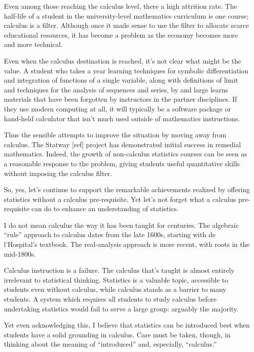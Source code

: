 Even among those reaching the calculus level,  there a high attrition rate. The half-life of a student in the university-level mathematics curriculum is one course; calculus is a filter.  Although once it made sense to use the filter to allocate scarce educational resources, it has become a problem as the economy becomes more and more technical.

Even when the calculus destination is reached, it's not clear what might be the value.  A student who takes a year learning techniques for symbolic differentiation and integration of functions of a single variable, along with definitions of limit and techniques for the analysis of sequences and series, by and large learns materials that have been forgotten by instructors in the partner disciplines.  If they use modern computing at all, it will typically be a software package or hand-held calculator that isn't much used outside of mathematics instructions.  

Thus the sensible attempts to improve the situation by moving away from calculus.  The Statway [ref] project has demonstrated initial success in remedial mathematics.  Indeed, the growth of non-calculus statistics courses can be seen as a reasonable response to the problem, giving students useful quantitative skills without imposing the calculus filter.

So, yes, let's continue to support the remarkable achievements realized by offering statistics without a calculus pre-requisite.  Yet let's not forget what a calculus pre-requisite can do to enhance an understanding of statistics.

I do not mean calculus the way it has been taught for centuries.  The algebraic ``rule'' approach to calculus dates from the late 1600s, starting with de l'Hospital's textbook.  The real-analysis approach is more recent, with roots in the mid-1800s.  

Calculus instruction is a failure.  The calculus that's taught is almost entirely irrelevant to statistical thinking.  Statistics is a valuable topic, accessible to students even without calculus, while calculus stands as a barrier to many students.  A system which requires all students to study calculus before undertaking statistics would fail to serve a large group: arguably the majority.

Yet even acknowledging this, I believe that statistics can be introduced best when students have a solid grounding in calculus.  Care must be taken, though, in thinking about the meaning of ``introduced'' and, especially, ``calculus.''  

